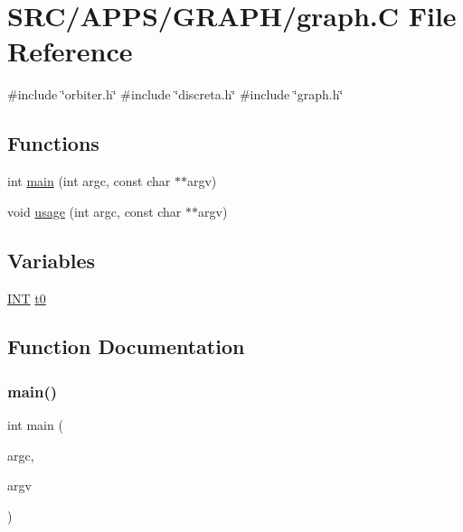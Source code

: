 \hypertarget{graph_8_c}{}\section{S\+R\+C/\+A\+P\+P\+S/\+G\+R\+A\+P\+H/graph.C File Reference}
\label{graph_8_c}
{\ttfamily \#include \char`\"{}orbiter.\+h\char`\"{}}\newline
{\ttfamily \#include \char`\"{}discreta.\+h\char`\"{}}\newline
{\ttfamily \#include \char`\"{}graph.\+h\char`\"{}}\newline
\subsection*{Functions}
\begin{DoxyCompactItemize}
\item 
int \mbox{\hyperlink{graph_8_c_a217dbf8b442f20279ea00b898af96f52}{main}} (int argc, const char $\ast$$\ast$argv)
\item 
void \mbox{\hyperlink{graph_8_c_a4f6af65d82bb5ceda6c2bdbee492b8f8}{usage}} (int argc, const char $\ast$$\ast$argv)
\end{DoxyCompactItemize}
\subsection*{Variables}
\begin{DoxyCompactItemize}
\item 
\mbox{\hyperlink{galois_8h_a09fddde158a3a20bd2dcadb609de11dc}{I\+NT}} \mbox{\hyperlink{graph_8_c_a4268f4fe222ffb119218a0199f5e1904}{t0}}
\end{DoxyCompactItemize}


\subsection{Function Documentation}
\mbox{\label{graph_8_c_a217dbf8b442f20279ea00b898af96f52}} 
\subsubsection{\texorpdfstring{main()}{main()}}
{\footnotesize\ttfamily int main (\begin{DoxyParamCaption}\item[{int}]{argc,  }\item[{const char $\ast$$\ast$}]{argv }\end{DoxyParamCaption})}

